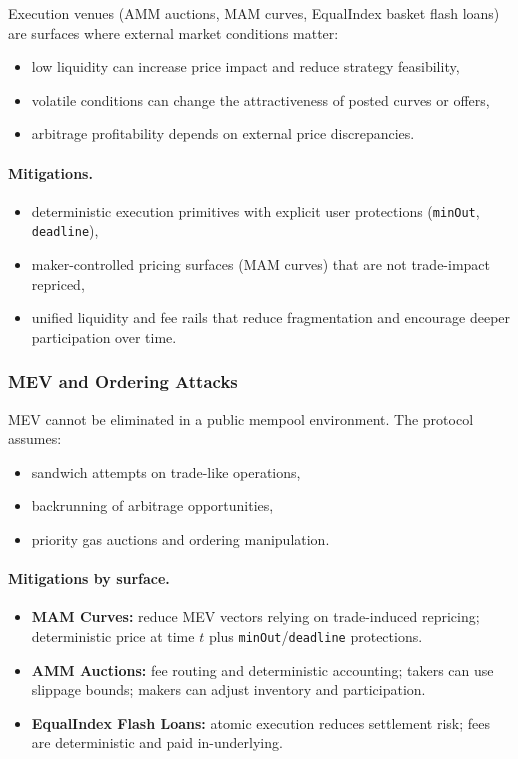 \documentclass[version=preprint]{iacrcc}
\begin{document}
Execution venues (AMM auctions, MAM curves, EqualIndex basket flash loans) are surfaces where external market conditions matter:
\begin{itemize}
  \item low liquidity can increase price impact and reduce strategy feasibility,
  \item volatile conditions can change the attractiveness of posted curves or offers,
  \item arbitrage profitability depends on external price discrepancies.
\end{itemize}

\paragraph{Mitigations.}
\begin{itemize}
  \item deterministic execution primitives with explicit user protections (\texttt{minOut}, \texttt{deadline}),
  \item maker-controlled pricing surfaces (MAM curves) that are not trade-impact repriced,
  \item unified liquidity and fee rails that reduce fragmentation and encourage deeper participation over time.
\end{itemize}

\subsubsection{MEV and Ordering Attacks}

MEV cannot be eliminated in a public mempool environment. The protocol assumes:
\begin{itemize}
  \item sandwich attempts on trade-like operations,
  \item backrunning of arbitrage opportunities,
  \item priority gas auctions and ordering manipulation.
\end{itemize}

\paragraph{Mitigations by surface.}
\begin{itemize}
  \item \textbf{MAM Curves:} reduce MEV vectors relying on trade-induced repricing; deterministic price at time $t$ plus \texttt{minOut}/\texttt{deadline} protections.
  \item \textbf{AMM Auctions:} fee routing and deterministic accounting; takers can use slippage bounds; makers can adjust inventory and participation.
  \item \textbf{EqualIndex Flash Loans:} atomic execution reduces settlement risk; fees are deterministic and paid in-underlying.
\end{itemize}
\end{document}
